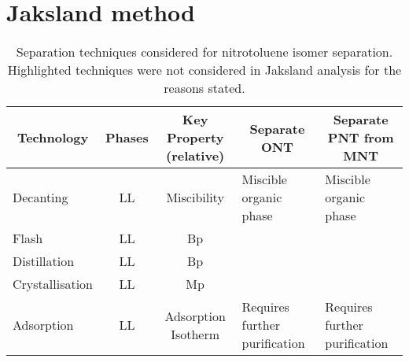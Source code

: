 \section{Jaksland method}
\label{app:jaksland}

\begin{landscape}

\begin{table}[H]
\centering
\caption{Separation techniques considered for nitrotoluene isomer separation. Highlighted techniques were not considered in Jaksland analysis for the reasons stated.}
\label{tab:separation techniques}
\begin{tabular}{lccll}
\toprule
\multicolumn{1}{c}{{Technology}} & {Phases} & {Key Property (relative)} & \multicolumn{1}{c}{{\textbf{Separate ONT}}} & \multicolumn{1}{c}{{\textbf{Separate PNT from MNT}}} \\ \midrule
Decanting                                                                     & LL                            & Miscibility                                    & \cellcolor[HTML]{F8CBAD}Miscible organic phase                                            & \cellcolor[HTML]{F8CBAD}Miscible organic phase                                                      \\
Flash                                                                         & LL                            & Bp                                             &                                                                                           &                                                                                                     \\
Distillation                                                                  & LL                            & Bp                                             &                                                                                           &                                                                                                     \\
Crystallisation                                                               & LL                            & Mp                                             &                                                                                           &                                                                                                     \\
Adsorption                                                                    & LL                            & Adsorption Isotherm                            & \cellcolor[HTML]{F8CBAD}Requires further purification                                     & \cellcolor[HTML]{F8CBAD}Requires further purification                                               \\

\end{tabular}
\end{table}
\end{landscape}
